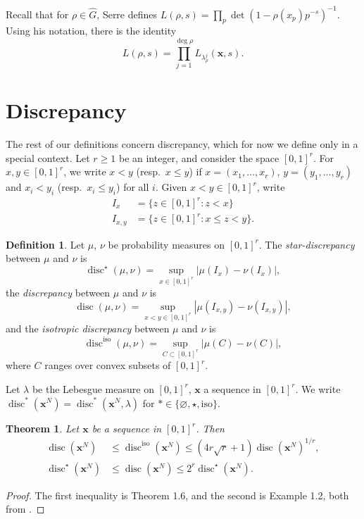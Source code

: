 \documentclass{article}
\DeclareMathOperator{\disc}{disc}
\newcommand{\bx}{{\boldsymbol x}}
\newcommand{\iso}{\mathrm{iso}}
\newtheorem{theorem}[subsection]{Theorem}
\theoremstyle{definition}
\newtheorem{definition}[subsection]{Definition}
\begin{document}
Recall that for $\rho\in \widehat G$, Serre defines 
$L(\rho,s) = \prod_p \det(1-\rho(x_p) p^{-s})^{-1}$. Using his notation, there 
is the identity 
\[
	L(\rho,s) = \prod_{j=1}^{\deg\rho} L_{\lambda_\rho^j}(\bx,s) .
\]





\section{Discrepancy}\label{sec:discrepancy}

The rest of our definitions concern discrepancy, which for now we define only 
in a special context. Let $r\geqslant 1$ be an integer, and consider the space 
$[0,1]^r$. For $x,y\in [0,1]^r$, we write $x<y$ (resp.~$x\leqslant y$) if 
$x=(x_1,\dots,x_r)$, $y=(y_1,\dots,y_r)$ and $x_i<y_i$ 
(resp.~$x_i\leqslant y_i$) for all $i$. Given $x<y\in [0,1]^r$, write 
\begin{align*}
	I_x &= \{z\in [0,1]^r : z<x\} \\
	I_{x,y} &= \{z\in [0,1]^r : x\leqslant z<y\} .
\end{align*}

\begin{definition}
Let $\mu$, $\nu$ be probability measures on $[0,1]^r$. The 
\emph{star-discrepancy} between $\mu$ and $\nu$ is 
\[
	\disc^\star(\mu,\nu) = \sup_{x\in [0,1]^r} |\mu(I_x)-\nu(I_x)| ,
\]
the \emph{discrepancy} between $\mu$ and $\nu$ is 
\[
	\disc(\mu,\nu) = \sup_{x<y\in [0,1]^r} |\mu(I_{x,y})-\nu(I_{x,y})| ,
\]
and the \emph{isotropic discrepancy} between $\mu$ and $\nu$ is 
\[
	\disc^\iso(\mu,\nu) = \sup_{C\subset [0,1]^r} |\mu(C)-\nu(C)| ,
\]
where $C$ ranges over convex subsets of $[0,1]^r$. 
\end{definition}

Let $\lambda$ be the Lebesgue measure on $[0,1]^r$, $\bx$ a sequence in 
$[0,1]^r$. We write $\disc^\ast(\bx^N)=\disc^\ast(\bx^N,\lambda)$ for 
$\ast\in \{\varnothing,\star,\iso\}$. 

\begin{theorem}
Let $\bx$ be a sequence in $[0,1]^r$. Then 
\begin{align*}
	\disc(\bx^N) &\leqslant \disc^\iso(\bx^N) \leqslant (4 r \sqrt r+1) \disc(\bx^N)^{1/r} ,\\
	\disc^\star(\bx^N) &\leqslant \disc(\bx^N) \leqslant 2^r \disc^\star(\bx^N) .
\end{align*}
\end{theorem}
\begin{proof}
The first inequality is Theorem 1.6, and the second is Example 1.2, both from 
\cite[Ch.2]{kuipers-niederreiter-1974}. 
\end{proof}
\end{document}
